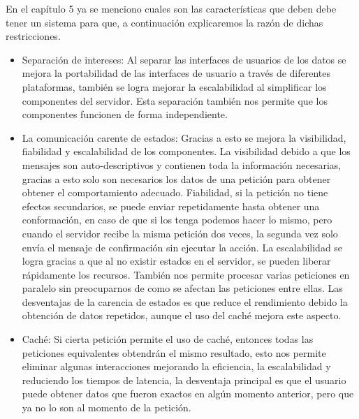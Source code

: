 \documentclass[12pt,a4paper,spanish,openany]{book}
\begin{document}
En el capítulo 5 ya se menciono cuales son las características que deben debe
tener un sistema para que, a continuación explicaremos la razón de dichas
restricciones.



\begin{itemize}

 \item Separación de intereses: Al separar las interfaces de
 usuarios de los datos se mejora la portabilidad de las interfaces de usuario a
 través de diferentes plataformas, también se logra mejorar la escalabilidad al
 simplificar los componentes del servidor. Esta separación también nos permite
 que los componentes funcionen de forma independiente.
 
 \item  La comunicación carente de estados: Gracias a esto se mejora la
 visibilidad, fiabilidad y escalabilidad de los componentes. La visibilidad
 debido a que los mensajes son auto-descriptivos y contienen toda la información
 necesarias, gracias a esto solo son necesarios los datos de una petición para
 obtener obtener el comportamiento adecuado. Fiabilidad, si la petición no tiene efectos secundarios, se puede enviar repetidamente hasta obtener una
 conformación, en caso de que si los tenga podemos hacer lo mismo, pero cuando
 el servidor recibe la misma petición dos veces, la segunda vez solo envía el
 mensaje de confirmación sin ejecutar la acción. La escalabilidad se logra
 gracias a que al no existir estados en el servidor, se pueden liberar
 rápidamente los recursos. También nos permite procesar varias peticiones en
 paralelo sin preocuparnos de como se afectan las peticiones entre ellas.
 Las desventajas de la carencia de estados es que reduce el rendimiento debido
 la obtención de datos repetidos, aunque el uso del caché mejora este aspecto.


    
    \item Caché: Si cierta petición permite el uso de caché, entonces todas
    las peticiones equivalentes obtendrán el mismo resultado, esto nos permite
    eliminar algunas interacciones mejorando la eficiencia, la escalabilidad y
    reduciendo los tiempos de latencia, la desventaja principal es que el
    usuario puede obtener datos que fueron exactos en algún momento anterior,
    pero que ya no lo son al momento de la petición.
    

\end{itemize}
\end{document}

